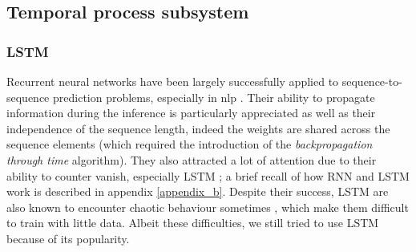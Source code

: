 \documentclass[12pt, a4paper]{report}
\begin{document}
			\subsection{Temporal process subsystem}\label{lstm}
				\subsubsection{LSTM}\label{lstm}
					Recurrent neural networks have been largely successfully applied to sequence-to-sequence prediction problems, especially in \gls{nlp} \cite{wu2016google,shen2018natural,miao2020application}.
					Their ability to propagate information during the inference is particularly appreciated as well as their independence of the sequence length, indeed the weights are shared across the sequence elements (which required the introduction of the {\itshape backpropagation through time} algorithm).
					They also attracted a lot of attention due to their ability to counter \gls{vanish}, especially LSTM \cite{Hochreiter1997lstm}; a brief recall of how RNN and LSTM work is described in appendix \ref{appendix_b}.
					Despite their success, LSTM are also known to encounter chaotic behaviour sometimes \cite{bertschinger2004,laurent2016recurrent}, which make them difficult to train with little data.
					Albeit these difficulties, we still tried to use LSTM because of its popularity.
\end{document}
